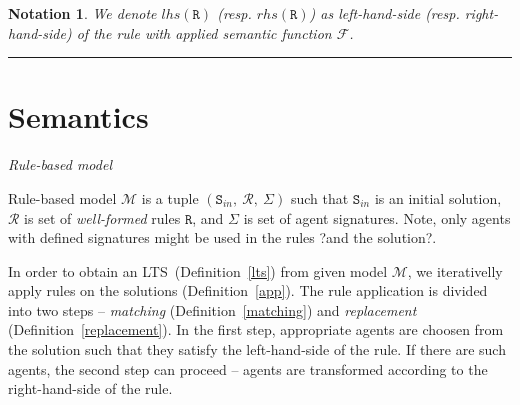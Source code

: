 \documentclass{elsarticle}
\newtheorem{notation}{Notation}
\begin{document}
\begin{notation}

We denote $lhs(\mathtt{R})$ (resp. $rhs(\mathtt{R})$) as left-hand-side (resp. right-hand-side) of the rule with applied semantic function $\mathcal{F}$. 
\end{notation}

\noindent\rule{\textwidth}{1pt}


\section{Semantics}

\begin{definition}
\emph{Rule-based model} 

\noindent Rule-based model $\mathcal{M}$ is a tuple $ (\mathtt{S}_{in},~\mathcal{R},~\Sigma) $ such that $\mathtt{S}_{in}$ is an initial solution, $\mathcal{R}$ is set of \emph{well-formed} rules $\mathtt{R}$, and $\Sigma$ is set of agent signatures. Note, only agents with defined signatures might be used in the rules ?and the solution?.
\end{definition}

In order to obtain an LTS~(Definition~\ref{lts}) from given model $\mathcal{M}$, we iterativelly apply rules on the solutions (Definition~\ref{app}). The rule application is divided into two steps -- \textit{matching} (Definition~\ref{matching}) and \textit{replacement} (Definition~\ref{replacement}). In the first step, appropriate agents are choosen from the solution such that they satisfy the left-hand-side of the rule. If there are such agents, the second step can proceed -- agents are transformed according to the right-hand-side of the rule.
\end{document}
